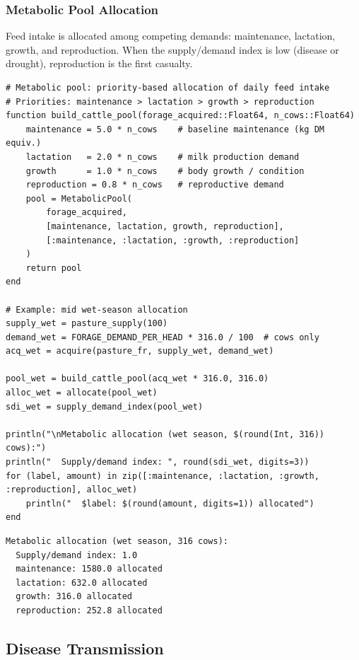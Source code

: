 \subsubsection{Metabolic Pool Allocation}



\label{1781271705069524406}{}


Feed intake is allocated among competing demands: maintenance, lactation, growth, and reproduction. When the supply/demand index is low (disease or drought), reproduction is the first casualty.




\begin{verbatim}
# Metabolic pool: priority-based allocation of daily feed intake
# Priorities: maintenance > lactation > growth > reproduction
function build_cattle_pool(forage_acquired::Float64, n_cows::Float64)
    maintenance = 5.0 * n_cows    # baseline maintenance (kg DM equiv.)
    lactation   = 2.0 * n_cows    # milk production demand
    growth      = 1.0 * n_cows    # body growth / condition
    reproduction = 0.8 * n_cows   # reproductive demand
    pool = MetabolicPool(
        forage_acquired,
        [maintenance, lactation, growth, reproduction],
        [:maintenance, :lactation, :growth, :reproduction]
    )
    return pool
end

# Example: mid wet-season allocation
supply_wet = pasture_supply(100)
demand_wet = FORAGE_DEMAND_PER_HEAD * 316.0 / 100  # cows only
acq_wet = acquire(pasture_fr, supply_wet, demand_wet)

pool_wet = build_cattle_pool(acq_wet * 316.0, 316.0)
alloc_wet = allocate(pool_wet)
sdi_wet = supply_demand_index(pool_wet)

println("\nMetabolic allocation (wet season, $(round(Int, 316)) cows):")
println("  Supply/demand index: ", round(sdi_wet, digits=3))
for (label, amount) in zip([:maintenance, :lactation, :growth, :reproduction], alloc_wet)
    println("  $label: $(round(amount, digits=1)) allocated")
end
\end{verbatim}




\begin{verbatim}
Metabolic allocation (wet season, 316 cows):
  Supply/demand index: 1.0
  maintenance: 1580.0 allocated
  lactation: 632.0 allocated
  growth: 316.0 allocated
  reproduction: 252.8 allocated
\end{verbatim}



\subsection{Disease Transmission}




